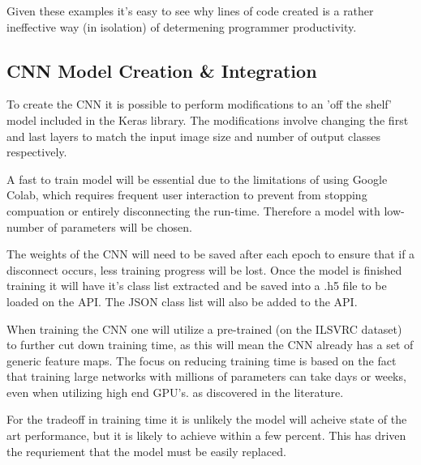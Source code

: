    Given these examples it's easy to see why lines of code created is a rather ineffective way (in isolation) of determening programmer productivity.

 \subsection{CNN Model Creation \& Integration}
  To create the CNN it is possible to perform modifications to an 'off the shelf' model included in the Keras library. The modifications involve changing the first and last layers to match the input image size and number of output classes  respectively.
  \par
  A fast to train model will be essential due to the limitations of using Google Colab, which requires frequent user interaction to prevent from stopping compuation or entirely disconnecting the run-time. Therefore a model with low-number of parameters will be chosen.
  \par
  The weights of the CNN will need to be saved after each epoch to ensure that if a disconnect occurs, less training progress will be lost. Once the model is finished training it will have it's class list extracted and be saved into a .h5 file to be loaded on the API. The JSON class list will also be added to the API.
  \par
  When training the CNN one will utilize a pre-trained (on the ILSVRC dataset) to further cut down training time, as this will mean the CNN already has a set of generic feature maps. The focus on reducing training time is based on the fact that training large networks with millions of parameters can take days or weeks, even when utilizing high end GPU's. as discovered in the literature.
  \par
  For the tradeoff in training time it is unlikely the model will acheive state of the art performance, but it is likely to achieve within a few percent. This has driven the requriement that the model must be easily replaced.

